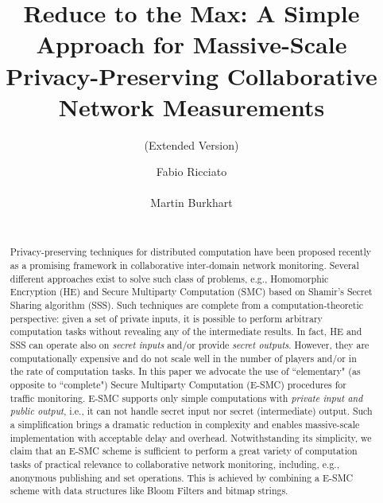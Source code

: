 \documentclass{sig-alternate}
\begin{document}
\title{Reduce to the Max: A Simple Approach for Massive-Scale Privacy-Preserving Collaborative Network Measurements}
\subtitle{(Extended Version)}

\author{
  \alignauthor Fabio Ricciato \\
     \\
\alignauthor Martin Burkhart \\
     \\
}

\maketitle              


\begin{abstract}
Privacy-preserving techniques for distributed computation have been proposed recently as a promising framework in collaborative  inter-domain network monitoring.
Several different approaches exist to solve such class of problems, e.g., Homomorphic Encryption (HE) and Secure Multiparty Computation (SMC) based on Shamir's Secret Sharing algorithm (SSS). 
Such techniques are complete from a computation-theoretic perspective: given a set of private inputs, it is possible to perform arbitrary computation tasks without revealing any of the intermediate results. In fact, HE and SSS can operate also on {\em secret inputs} and/or provide {\em secret outputs}. 
However, they are computationally expensive and do not scale well in the number of players and/or in the rate of computation tasks.
In this paper we advocate the use of ``elementary" (as opposite to ``complete") Secure Multiparty Computation (E-SMC) procedures for traffic monitoring.
 E-SMC supports only simple computations with {\em private input and public output}, i.e., it can not handle secret input nor secret (intermediate) output. 
 Such a simplification brings a dramatic reduction in complexity and enables 
 massive-scale implementation with acceptable delay and overhead. Notwithstanding its simplicity, we claim that an E-SMC scheme 
 is sufficient to perform a great variety of computation tasks of practical relevance to collaborative network monitoring, including, e.g., anonymous publishing and set operations. This is achieved by combining a E-SMC scheme with data structures like Bloom Filters and bitmap strings.  
\end{abstract}
\end{document}
